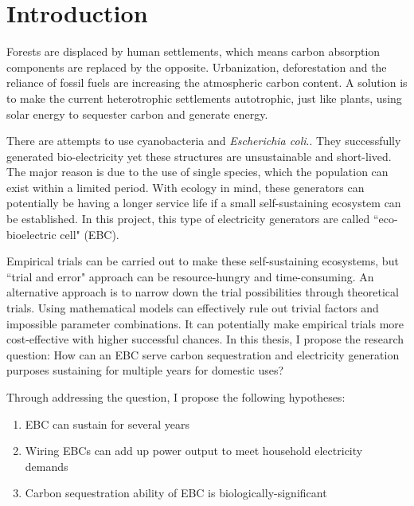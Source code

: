 \documentclass[../thesis.tex]{subfiles} %
\begin{document}
\section{Introduction}
Forests are displaced by human settlements, which means carbon absorption components are replaced by the opposite.  Urbanization, deforestation and the reliance of fossil fuels are increasing the atmospheric carbon content\autocite{ferguson2000electricity,schuur2015climate}.  A solution is to make the current heterotrophic settlements autotrophic, just like plants, using solar energy to sequester carbon and generate energy.

There are attempts to use cyanobacteria\autocite{joshi2018bacterial,mccormick2015biophotovoltaics,sawa2017electricity} and \textit{Escherichia coli}.\autocite{songera2012electricity}. They successfully generated bio-electricity yet these structures are unsustainable and short-lived.  The major reason is due to the use of single species, which the population can exist within a limited period.  With ecology in mind, these generators can potentially be having a longer service life if a small self-sustaining ecosystem can be established.  In this project, this type of electricity generators are called ``eco-bioelectric cell" (EBC).

Empirical trials can be carried out to make these self-sustaining ecosystems, but ``trial and error" approach can be resource-hungry and time-consuming.  An alternative approach is to narrow down the trial possibilities through theoretical trials.  Using mathematical models can effectively rule out trivial factors and impossible parameter combinations.  It can potentially make empirical trials more cost-effective with higher successful chances.  In this thesis, I propose the research question: How can an EBC serve carbon sequestration and electricity generation purposes sustaining for multiple years for domestic uses?

Through addressing the question, I propose the following hypotheses:
\begin{enumerate}
    \item EBC can sustain for several years
    \item Wiring EBCs can add up power output to meet household electricity demands
    \item Carbon sequestration ability of EBC is biologically-significant
\end{enumerate}
\end{document}
